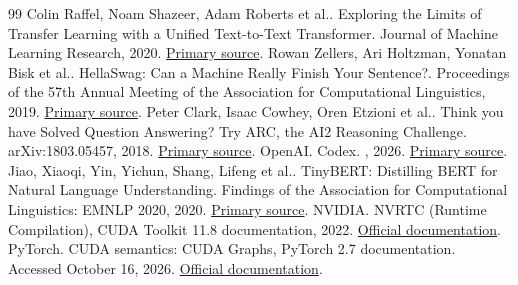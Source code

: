 \documentclass[conference]{IEEEtran}
\begin{document}
\begin{thebibliography}{99}
 Colin Raffel, Noam Shazeer, Adam Roberts et al.. Exploring the Limits of Transfer Learning with a Unified Text-to-Text Transformer. Journal of Machine Learning Research, 2020. \href{https://jmlr.org/papers/v21/20-074.html}{Primary source}.
 Rowan Zellers, Ari Holtzman, Yonatan Bisk et al.. HellaSwag: Can a Machine Really Finish Your Sentence?. Proceedings of the 57th Annual Meeting of the Association for Computational Linguistics, 2019. \href{https://aclanthology.org/P19-1472/}{Primary source}.
 Peter Clark, Isaac Cowhey, Oren Etzioni et al.. Think you have Solved Question Answering? Try ARC, the AI2 Reasoning Challenge. arXiv:1803.05457, 2018. \href{https://arxiv.org/abs/1803.05457}{Primary source}.
 OpenAI. Codex. , 2026. \href{https://openai.com/codex/}{Primary source}.
 Jiao, Xiaoqi, Yin, Yichun, Shang, Lifeng et al.. TinyBERT: Distilling BERT for Natural Language Understanding. Findings of the Association for Computational Linguistics: EMNLP 2020, 2020. \href{https://aclanthology.org/2020.findings-emnlp.372/}{Primary source}.
 NVIDIA. NVRTC (Runtime Compilation), CUDA Toolkit 11.8 documentation, 2022. \href{https://docs.nvidia.com/cuda/archive/11.8.0/nvrtc/index.html}{Official documentation}.
 PyTorch. CUDA semantics: CUDA Graphs, PyTorch 2.7 documentation. Accessed October 16, 2026. \href{https://docs.pytorch.org/docs/2.7/notes/cuda.html\#cuda-graphs}{Official documentation}.
\end{thebibliography}
\end{document}
